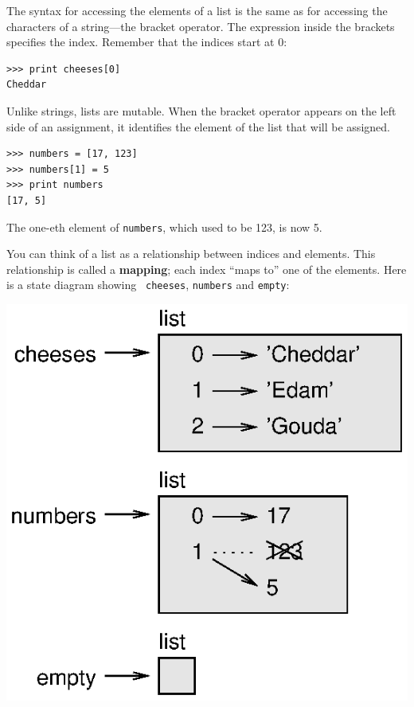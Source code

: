 \documentclass[10pt]{book}
\begin{document}
The syntax for accessing the elements of a list is the same as for
accessing the characters of a string---the bracket operator.  The
expression inside the brackets specifies the index.  Remember that the
indices start at 0:

\beforeverb
\begin{verbatim}
>>> print cheeses[0]
Cheddar
\end{verbatim}
\afterverb
%
Unlike strings, lists are mutable.  When the bracket operator appears
on the left side of an assignment, it identifies the element of the
list that will be assigned.


\beforeverb
\begin{verbatim}
>>> numbers = [17, 123]
>>> numbers[1] = 5
>>> print numbers
[17, 5]
\end{verbatim}
\afterverb
%
The one-eth element of {\tt numbers}, which
used to be 123, is now 5.


You can think of a list as a relationship between indices and
elements.  This relationship is called a {\bf mapping}; each index
``maps to'' one of the elements.  Here is a state diagram showing {\tt
cheeses}, {\tt numbers} and {\tt empty}:


\beforefig
\centerline{\includegraphics{figs/list_state.eps}}
\afterfig
\end{document}
